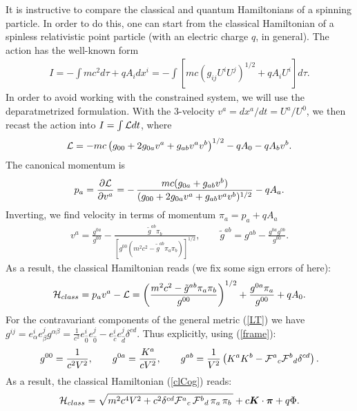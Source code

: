 \documentclass[preprint,showpacs,preprintnumbers,eqsecnum,amsmath,amssymb]{revtex4-1}
\begin{document}
It is instructive to compare the classical and quantum Hamiltonians
of a spinning particle. In order to do this, one can start from the
classical Hamiltonian of a spinless relativistic point particle (with
an electric charge $q$, in general). The action has the well-known form
\begin{eqnarray}
I = - \int mc^2d\tau + qA_idx^i = -\int \left[mc\left(g_{ij}U^iU^j
\right)^{1/2} + qA_iU^i\right]d\tau.\label{I0}
\end{eqnarray}
In order to avoid working with the constrained system, we will use
the deparatmetrized formulation. With the 3-velocity $v^a = dx^a/dt =
U^a/U^0$, we then recast the action into $I = \int{\cal L} dt$, where
\begin{eqnarray}
{\cal L} = -mc\left(g_{00} + 2g_{0a}v^a + g_{ab}v^av^b\right)^{1/2}
- qA_0 - qA_bv^b.\label{L0}
\end{eqnarray}
The canonical momentum is
\begin{eqnarray}
p_a = {\frac {\partial {\cal L}}{\partial v^a}} = -\,{\frac {mc(g_{0a} + g_{ab}v^b)}
{(g_{00} + 2g_{0a}v^a + g_{ab}v^av^b)^{1/2}}} - qA_a.\label{pa}
\end{eqnarray}
Inverting, we find velocity in terms of momentum $\pi_a = p_a + qA_a$
\begin{eqnarray}
v^a = {\frac {g^{0a}}{g^{00}}} - {\frac {\tilde{g}^{ab}\pi_b}
{[g^{00}(m^2c^2 - \tilde{g}^{ab}\pi_a\pi_b)]^{1/2}}},\qquad  \tilde{g}^{ab}
= g^{ab} - \frac{g^{0a}g^{0b}}{{g}^{00}}.\label{va}
\end{eqnarray}
As a result, the classical Hamiltonian reads (we fix some sign errors of
\cite{Cogn} here):
\begin{equation}
{\cal H}_{class} = p_av^a - {\cal L} = \left(\frac{m^2c^2 - \tilde{g}^{ab}\pi_a\pi_b}
{{g}^{00}}\right)^{1/2} + \frac{g^{0a}\pi_a}{{g}^{00}} + qA_0.\label{clCog}
\end{equation}
For the contravariant components of the general metric (\ref{LT}) we have
$g^{ij} = e^i_\alpha e^j_\beta g^{\alpha\beta} = {\frac 1{c^2}}e^i_{\hat{0}}
e^j_{\hat{0}} - e^i_{\hat{c}}e^j_{\hat{d}}\delta^{cd}$. Thus explicitly, using
(\ref{frame}):
\begin{eqnarray}
g^{00} = {\frac {1}{c^2V^2}},\qquad g^{0a} = {\frac {K^a}{cV^2}},\qquad
g^{ab} = {\frac {1}{V^2}}\left(K^aK^b - {\cal F}^a{}_c{\cal F}^b{}_d
\delta^{cd}\right).\label{contra}
\end{eqnarray}
As a result, the classical Hamiltonian (\ref{clCog}) reads:
\begin{equation}
{\cal H}_{class}=\sqrt{m^2c^4V^2 + c^2\delta^{cd}{\cal F}^a{}_c\,{\cal F}^b{}_d
\,\pi_a\,\pi_b\,} + c{\bm K}\cdot{\bm\pi} + q\Phi.\label{clasp0}
\end{equation}
\end{document}
